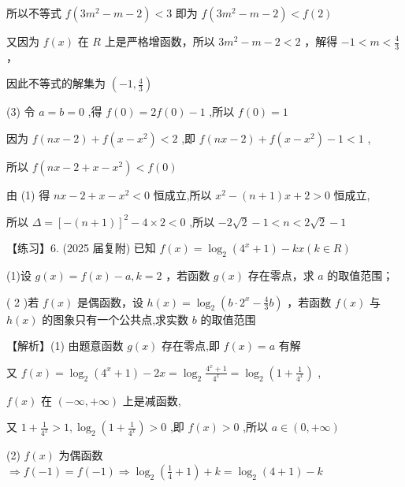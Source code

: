 \documentclass[10pt]{article}
\begin{document}
所以不等式 \(f\left( {3{m}^{2} - m - 2}\right)  < 3\) 即为 \(f\left( {3{m}^{2} - m - 2}\right)  < f\left( 2\right)\)

又因为 \(f\left( x\right)\) 在 \(R\) 上是严格增函数，所以 \(3{m}^{2} - m - 2 < 2\) ，解得 \(- 1 < m < \frac{4}{3}\) ，

因此不等式的解集为 \(\left( {-1,\frac{4}{3}}\right)\)

(3) 令 \(a = b = 0\) ,得 \(f\left( 0\right)  = {2f}\left( 0\right)  - 1\) ,所以 \(f\left( 0\right)  = 1\)

因为 \(f\left( {{nx} - 2}\right)  + f\left( {x - {x}^{2}}\right)  < 2\) ,即 \(f\left( {{nx} - 2}\right)  + f\left( {x - {x}^{2}}\right)  - 1 < 1\) ,

所以 \(f\left( {{nx} - 2 + x - {x}^{2}}\right)  < f\left( 0\right)\)

由 (1) 得 \({nx} - 2 + x - {x}^{2} < 0\) 恒成立,所以 \({x}^{2} - \left( {n + 1}\right) x + 2 > 0\) 恒成立,

所以 \(\Delta  = {\left\lbrack  -\left( n + 1\right) \right\rbrack  }^{2} - 4 \times  2 < 0\) ,所以 \(- 2\sqrt{2} - 1 < n < 2\sqrt{2} - 1\)

【练习】6. (2025 届复附) 已知 \(f\left( x\right)  = {\log }_{2}\left( {{4}^{x} + 1}\right)  - {kx}\left( {k \in  R}\right)\)

(1)设 \(g\left( x\right)  = f\left( x\right)  - a,k = 2\) ，若函数 \(g\left( x\right)\) 存在零点，求 \(a\) 的取值范围；

( 2 )若 \(f\left( x\right)\) 是偶函数，设 \(h\left( x\right)  = {\log }_{2}\left( {b \cdot  {2}^{x} - \frac{4}{3}b}\right)\) ，若函数 \(f\left( x\right)\) 与 \(h\left( x\right)\) 的图象只有一个公共点,求实数 \(b\) 的取值范围

【解析】(1) 由题意函数 \(g\left( x\right)\) 存在零点,即 \(f\left( x\right)  = a\) 有解

又 \(f\left( x\right)  = {\log }_{2}\left( {{4}^{x} + 1}\right)  - {2x} = {\log }_{2}\frac{{4}^{x} + 1}{{4}^{x}} = {\log }_{2}\left( {1 + \frac{1}{{4}^{x}}}\right)\) ,

\(f\left( x\right)\) 在 \(\left( {-\infty , + \infty }\right)\) 上是减函数,

又 \(1 + \frac{1}{{4}^{x}} > 1,{\log }_{2}\left( {1 + \frac{1}{{4}^{x}}}\right)  > 0\) ,即 \(f\left( x\right)  > 0\) ,所以 \(a \in  \left( {0, + \infty }\right)\)

(2) \(f\left( x\right)\) 为偶函数 \(\Rightarrow  f\left( {-1}\right)  = f\left( {-1}\right)  \Rightarrow  {\log }_{2}\left( {\frac{1}{4} + 1}\right)  + k = {\log }_{2}\left( {4 + 1}\right)  - k\)
\end{document}

